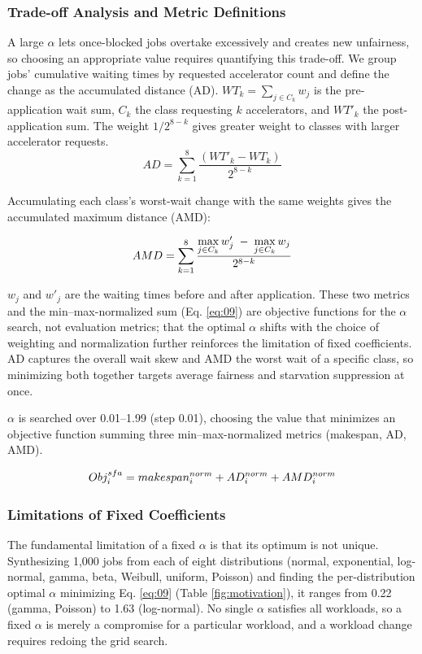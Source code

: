 \documentclass{ieeetj}
\begin{document}
\subsubsection{Trade-off Analysis and Metric Definitions}
A large $\alpha$ lets once-blocked jobs overtake excessively and creates new unfairness, so choosing an appropriate value requires quantifying this trade-off. We group jobs' cumulative waiting times by requested accelerator count and define the change as the accumulated distance (AD). $WT_k=\sum_{j\in C_k} w_j$ is the pre-application wait sum, $C_k$ the class requesting $k$ accelerators, and $WT'_k$ the post-application sum. The weight $1/2^{8-k}$ gives greater weight to classes with larger accelerator requests.
\begin{equation}
AD = \sum_{k=1}^8 \frac{(WT'_k - WT_k)}{2^{8-k}}
\label{eq:07}
\end{equation}

Accumulating each class's worst-wait change with the same weights gives the accumulated maximum distance (AMD):

\begin{equation}
AMD = \sum_{k=1}^8 \frac{\max\limits_{j\in C_k} w'_j \;-\; \max\limits_{j\in C_k} w_j}{2^{8-k}}
\label{eq:08}
\vspace{2pt}
\end{equation}

$w_j$ and $w'_j$ are the waiting times before and after application. These two metrics and the min--max-normalized sum (Eq. \eqref{eq:09}) are objective functions for the $\alpha$ search, not evaluation metrics; that the optimal $\alpha$ shifts with the choice of weighting and normalization further reinforces the limitation of fixed coefficients. AD captures the overall wait skew and AMD the worst wait of a specific class, so minimizing both together targets average fairness and starvation suppression at once.

$\alpha$ is searched over 0.01--1.99 (step 0.01), choosing the value that minimizes an objective function summing three min--max-normalized metrics (makespan, AD, AMD).

\begin{equation}
Obj_i^{sfa} = makespan_i^{norm} + AD_i^{norm} + AMD_i^{norm}
\label{eq:09}
\vspace{2pt}
\end{equation}

\subsubsection{Limitations of Fixed Coefficients}\label{coeff:limit}
The fundamental limitation of a fixed $\alpha$ is that its optimum is not unique. Synthesizing 1,000 jobs from each of eight distributions (normal, exponential, log-normal, gamma, beta, Weibull, uniform, Poisson) and finding the per-distribution optimal $\alpha$ minimizing Eq. \eqref{eq:09} (Table \ref{fig:motivation}), it ranges from 0.22 (gamma, Poisson) to 1.63 (log-normal). No single $\alpha$ satisfies all workloads, so a fixed $\alpha$ is merely a compromise for a particular workload, and a workload change requires redoing the grid search.
\end{document}
